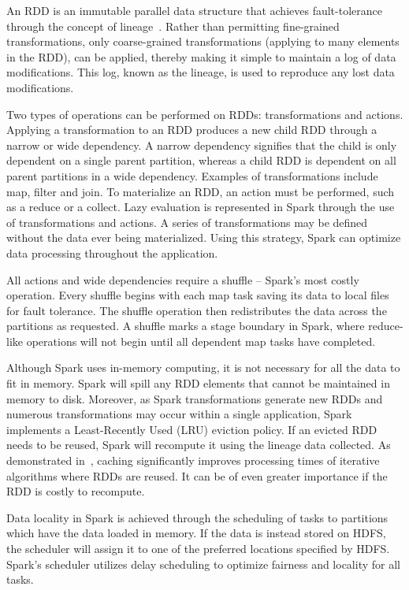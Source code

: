 An RDD is an immutable parallel data structure that achieves fault-tolerance
through the concept of lineage~\cite{zaharia2010spark}. Rather than permitting
fine-grained transformations, only coarse-grained transformations (applying to
many elements in the RDD), can be applied, thereby making it simple to maintain
a log of data modifications. This log, known as the lineage, is used to
reproduce any lost data modifications.

Two types of operations can be performed on RDDs: transformations and actions.
Applying a transformation to an RDD produces a new child RDD through a narrow or
wide dependency. A narrow dependency signifies that the child is only dependent
on a single parent partition, whereas a child RDD is dependent on all parent
partitions in a wide dependency. Examples of transformations include map, filter
and join. To materialize an RDD, an action must be performed, such as a reduce
or a collect. Lazy evaluation is represented in Spark through the use of
transformations and actions. A series of transformations may be defined without
the data ever being materialized. Using this strategy, Spark can optimize data
processing throughout the application.

All actions and wide dependencies require a shuffle -- Spark's most costly
operation. Every shuffle begins with each map task saving its data to local
files for fault tolerance. The shuffle operation then redistributes the data
across the partitions as requested. A shuffle marks a stage boundary in Spark,
where reduce-like operations will not begin until all dependent map tasks have
completed.

Although Spark uses in-memory computing, it is not necessary for all the data to
fit in memory. Spark will spill any RDD elements that cannot be maintained in
memory to disk. Moreover, as Spark transformations generate new RDDs and
numerous transformations may occur within a single application, Spark implements
a Least-Recently Used (LRU) eviction policy. If an evicted RDD needs to be
reused, Spark will recompute it using the lineage data collected. As
demonstrated in~\cite{freeman2014mapping}, caching significantly improves
processing times of iterative algorithms where RDDs are reused. It can be of
even greater importance if the RDD is costly to recompute.

Data locality in Spark is achieved through the scheduling of tasks to partitions
which have the data loaded in memory. If the data is instead stored on HDFS, the
scheduler will assign it to one of the preferred locations specified by HDFS.
Spark's scheduler utilizes delay scheduling to optimize fairness and locality
for all tasks.

